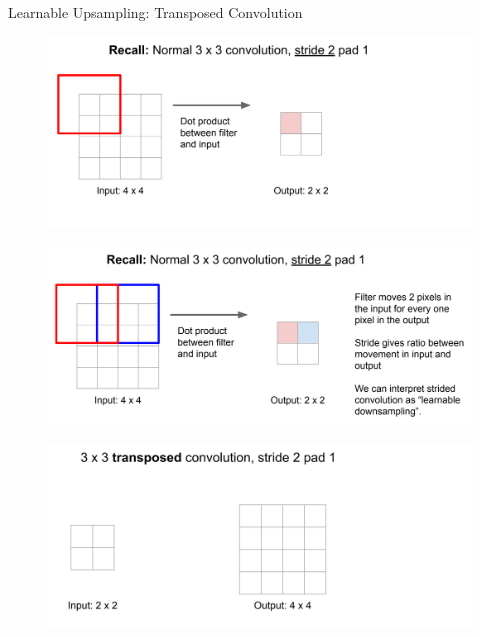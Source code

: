 \begin{frame}[allowframebreaks]{Learnable Upsampling: Transposed Convolution}
\begin{figure}
\centering
\includegraphics[width=1.0\textwidth,height=1.0\textheight,keepaspectratio]{images/segmentation/upsample_3.png}
\end{figure}

\framebreak

\begin{figure}
\centering
\includegraphics[width=1.0\textwidth,height=1.0\textheight,keepaspectratio]{images/segmentation/upsample_4.png}
\end{figure}

\framebreak

\begin{figure}
\centering
\includegraphics[width=1.0\textwidth,height=1.0\textheight,keepaspectratio]{images/segmentation/upsample_5.png}
\end{figure}


\end{frame}
